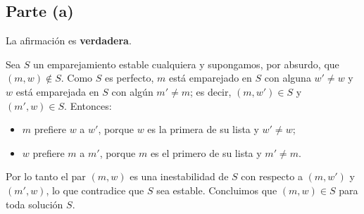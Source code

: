 
\subsection*{Parte (a)}
La afirmación es \textbf{verdadera}.

Sea $S$ un emparejamiento estable cualquiera y supongamos, por absurdo, que $(m,w)\notin S$.
Como $S$ es perfecto, $m$ está emparejado en $S$ con alguna $w'\neq w$ y $w$ está emparejada
en $S$ con algún $m'\neq m$; es decir, $(m,w')\in S$ y $(m',w)\in S$. Entonces:
\begin{itemize}
  \item $m$ prefiere $w$ a $w'$, porque $w$ es la primera de su lista y $w'\neq w$;
  \item $w$ prefiere $m$ a $m'$, porque $m$ es el primero de su lista y $m'\neq m$.
\end{itemize}
Por lo tanto el par $(m,w)$ es una inestabilidad de $S$ con respecto a $(m,w')$ y
$(m',w)$, lo que contradice que $S$ sea estable. Concluimos que $(m,w)\in S$ para toda
solución $S$.

